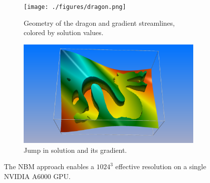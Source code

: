 \documentclass{elsarticle}
\begin{document}
\begin{figure}
     \centering
     \begin{subfigure}[b]{\textwidth}
         \centering
         \texttt{[image: ./figures/dragon.png]}
         \caption{Geometry of the dragon and gradient streamlines, colored by solution values.}
         \label{fig:dragon1}
     \end{subfigure}
     \begin{subfigure}[b]{\textwidth}
         \centering
         \includegraphics[width=\textwidth]{./figures/dragonSlice.png}
         \caption{Jump in solution and its gradient.}
         \label{fig:dragon2}
     \end{subfigure}
        \caption{The NBM approach enables a $1024^3$ effective resolution on a single NVIDIA A6000 GPU.}
        \label{fig:dragon}
\end{figure}
\end{document}
